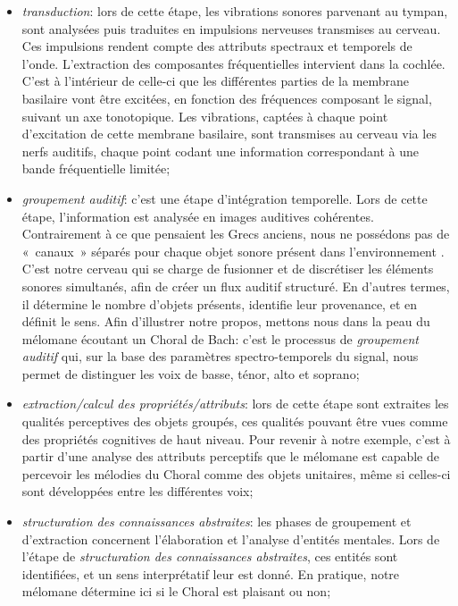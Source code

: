 \begin{itemize}

\item \emph{transduction}: lors de cette étape, les vibrations sonores parvenant au tympan, sont analysées puis traduites en impulsions nerveuses transmises au cerveau. Ces impulsions rendent compte des attributs spectraux et temporels de l'onde. L'extraction des composantes fréquentielles intervient dans la cochlée. C'est à l'intérieur de celle-ci que les différentes parties de la membrane basilaire vont être excitées, en fonction des fréquences composant le signal, suivant un axe tonotopique. Les vibrations, captées à chaque point d’excitation de cette membrane basilaire, sont transmises au cerveau via les nerfs auditifs, chaque point codant une information correspondant à une bande fréquentielle limitée; 
\item \emph{groupement auditif}: c'est une étape d'intégration temporelle. Lors de cette étape, l'information est analysée en images auditives cohérentes. Contrairement à ce que pensaient les Grecs anciens, nous ne possédons pas de «~canaux~» séparés pour chaque objet sonore présent dans l'environnement \citep{yost1994fundamentals}. C'est notre cerveau qui se charge de fusionner et de discrétiser les éléments sonores simultanés, afin de créer un flux auditif structuré. En d'autres termes, il détermine le nombre d'objets présents, identifie leur provenance, et en définit le sens. Afin d'illustrer notre propos, mettons nous dans la peau du mélomane écoutant un Choral de Bach: c'est le processus de \emph{groupement auditif} qui, sur la base des paramètres spectro-temporels du signal, nous permet de distinguer les voix de basse, ténor, alto et soprano;
\item \emph{extraction/calcul des propriétés/attributs}: lors de cette étape sont extraites les qualités perceptives des objets groupés, ces qualités pouvant être vues comme des propriétés cognitives de haut niveau. Pour revenir à notre exemple, c'est à partir d'une analyse des attributs perceptifs que le mélomane est capable de percevoir les mélodies du Choral comme des objets unitaires, même si celles-ci sont développées entre les différentes voix;
\item \emph{structuration des connaissances abstraites}: les phases de groupement et d'extraction concernent l'élaboration et l'analyse d'entités mentales. Lors de l'étape de \emph{structuration des connaissances abstraites}, ces entités sont identifiées, et un sens interprétatif leur est donné. En pratique, notre mélomane détermine ici si le Choral est plaisant ou non;

\end{itemize}
